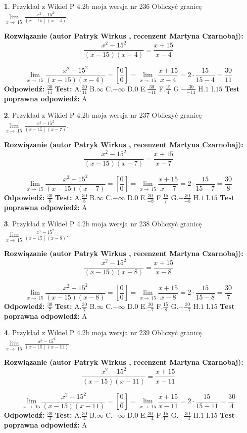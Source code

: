 \documentclass[12pt, a4paper]{article}
\theoremstyle{definition} %
\newtheorem{zad}{}
\newcommand{\zadStart}[1]{\begin{zad}#1\newline}
\newcommand{\zadStop}{\end{zad}}
\newcommand{\rozwStart}[2]{\noindent \textbf{Rozwiązanie (autor #1 , recenzent #2): }\newline}
\newcommand{\rozwStop}{\newline}
\newcommand{\odpStart}{\noindent \textbf{Odpowiedź:}\newline}
\newcommand{\odpStop}{\newline}
\newcommand{\testStart}{\noindent \textbf{Test:}\newline}
\newcommand{\testStop}{\newline}
\newcommand{\kluczStart}{\noindent \textbf{Test poprawna odpowiedź:}\newline}
\newcommand{\kluczStop}{\newline}
\begin{document}
\zadStart{Przykład z Wikieł P 4.2b moja wersja nr 236}
Obliczyć granicę $\lim\limits_{x\to\ 15}\frac{x^{2}-15^{2}}{(x-15)(x-4)}$.
\zadStop
\rozwStart{Patryk Wirkus}{Martyna Czarnobaj}
$$\frac{x^{2}-15^{2}}{(x-15)(x-4)}=\frac{x+15}{x-4}$$

$$\lim\limits_{x\to\ 15}\frac{x^{2}-15^{2}}{(x-15)(x-4)}=[\frac{0}{0}]=\lim\limits_{x\to\ 15}\frac{x+15}{x-4}=2 \cdot \frac{15}{15-4} = \frac{30}{11}$$
\rozwStop
\odpStart
$\frac{30}{11}$
\odpStop
\testStart
A.$\frac{30}{11}$
B.$\infty$
C.$-\infty$
D.$0$
E.$\frac{30}{-11}$
F.$\frac{15}{4}$
G.$-\frac{30}{-11}$
H.$1$
I.$15$
\testStop
\kluczStart
A
\kluczStop



\zadStart{Przykład z Wikieł P 4.2b moja wersja nr 237}
Obliczyć granicę $\lim\limits_{x\to\ 15}\frac{x^{2}-15^{2}}{(x-15)(x-7)}$.
\zadStop
\rozwStart{Patryk Wirkus}{Martyna Czarnobaj}
$$\frac{x^{2}-15^{2}}{(x-15)(x-7)}=\frac{x+15}{x-7}$$

$$\lim\limits_{x\to\ 15}\frac{x^{2}-15^{2}}{(x-15)(x-7)}=[\frac{0}{0}]=\lim\limits_{x\to\ 15}\frac{x+15}{x-7}=2 \cdot \frac{15}{15-7} = \frac{30}{8}$$
\rozwStop
\odpStart
$\frac{30}{8}$
\odpStop
\testStart
A.$\frac{30}{8}$
B.$\infty$
C.$-\infty$
D.$0$
E.$\frac{30}{-8}$
F.$\frac{15}{7}$
G.$-\frac{30}{-8}$
H.$1$
I.$15$
\testStop
\kluczStart
A
\kluczStop



\zadStart{Przykład z Wikieł P 4.2b moja wersja nr 238}
Obliczyć granicę $\lim\limits_{x\to\ 15}\frac{x^{2}-15^{2}}{(x-15)(x-8)}$.
\zadStop
\rozwStart{Patryk Wirkus}{Martyna Czarnobaj}
$$\frac{x^{2}-15^{2}}{(x-15)(x-8)}=\frac{x+15}{x-8}$$

$$\lim\limits_{x\to\ 15}\frac{x^{2}-15^{2}}{(x-15)(x-8)}=[\frac{0}{0}]=\lim\limits_{x\to\ 15}\frac{x+15}{x-8}=2 \cdot \frac{15}{15-8} = \frac{30}{7}$$
\rozwStop
\odpStart
$\frac{30}{7}$
\odpStop
\testStart
A.$\frac{30}{7}$
B.$\infty$
C.$-\infty$
D.$0$
E.$\frac{30}{-7}$
F.$\frac{15}{8}$
G.$-\frac{30}{-7}$
H.$1$
I.$15$
\testStop
\kluczStart
A
\kluczStop



\zadStart{Przykład z Wikieł P 4.2b moja wersja nr 239}
Obliczyć granicę $\lim\limits_{x\to\ 15}\frac{x^{2}-15^{2}}{(x-15)(x-11)}$.
\zadStop
\rozwStart{Patryk Wirkus}{Martyna Czarnobaj}
$$\frac{x^{2}-15^{2}}{(x-15)(x-11)}=\frac{x+15}{x-11}$$

$$\lim\limits_{x\to\ 15}\frac{x^{2}-15^{2}}{(x-15)(x-11)}=[\frac{0}{0}]=\lim\limits_{x\to\ 15}\frac{x+15}{x-11}=2 \cdot \frac{15}{15-11} = \frac{30}{4}$$
\rozwStop
\odpStart
$\frac{30}{4}$
\odpStop
\testStart
A.$\frac{30}{4}$
B.$\infty$
C.$-\infty$
D.$0$
E.$\frac{30}{-4}$
F.$\frac{15}{11}$
G.$-\frac{30}{-4}$
H.$1$
I.$15$
\testStop
\kluczStart
A
\kluczStop
\end{document}
